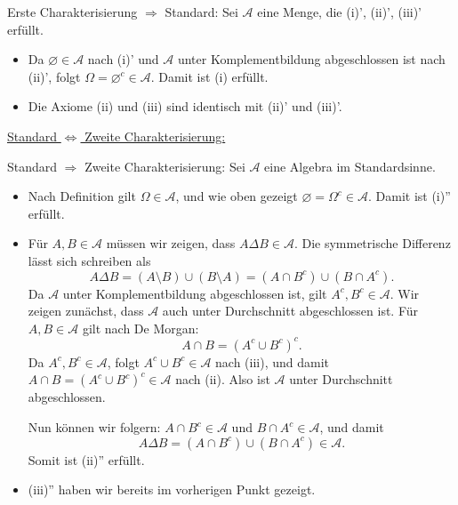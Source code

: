 \documentclass{article}
\newcommand{\Om}{\Omega}
\renewcommand{\AA}{\mathcal{A}}
\theoremstyle{definition}
\begin{document}
Erste Charakterisierung $\Rightarrow$ Standard: Sei $\AA$ eine Menge, die (i)', (ii)', (iii)' erfüllt.
\begin{itemize}
    \item Da $\varnothing \in \AA$ nach (i)' und $\AA$ unter Komplementbildung abgeschlossen ist nach (ii)', folgt $\Om = \varnothing^c \in \AA$. Damit ist (i) erfüllt.
    \item Die Axiome (ii) und (iii) sind identisch mit (ii)' und (iii)'.
\end{itemize}

\underline{Standard $\Leftrightarrow$ Zweite Charakterisierung:}

Standard $\Rightarrow$ Zweite Charakterisierung: Sei $\AA$ eine Algebra im Standardsinne.
\begin{itemize}
    \item Nach Definition gilt $\Om \in \AA$, und wie oben gezeigt $\varnothing = \Om^c \in \AA$. Damit ist (i)'' erfüllt.
    \item Für $A, B \in \AA$ müssen wir zeigen, dass $A \Delta B \in \AA$. Die symmetrische Differenz lässt sich schreiben als
    \[
    A \Delta B = (A \setminus B) \cup (B \setminus A) = (A \cap B^c) \cup (B \cap A^c).
    \]
    Da $\AA$ unter Komplementbildung abgeschlossen ist, gilt $A^c, B^c \in \AA$. Wir zeigen zunächst, dass $\AA$ auch unter Durchschnitt abgeschlossen ist. Für $A, B \in \AA$ gilt nach De Morgan:
    \[
    A \cap B = (A^c \cup B^c)^c.
    \]
    Da $A^c, B^c \in \AA$, folgt $A^c \cup B^c \in \AA$ nach (iii), und damit $A \cap B = (A^c \cup B^c)^c \in \AA$ nach (ii). Also ist $\AA$ unter Durchschnitt abgeschlossen.
    
    Nun können wir folgern: $A \cap B^c \in \AA$ und $B \cap A^c \in \AA$, und damit
    \[
    A \Delta B = (A \cap B^c) \cup (B \cap A^c) \in \AA.
    \]
    Somit ist (ii)'' erfüllt.
    \item (iii)'' haben wir bereits im vorherigen Punkt gezeigt.
\end{itemize}
\end{document}
